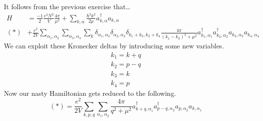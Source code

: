 \documentclass{article}
\begin{document}
It follows from the previous exercise that\dots
\begin{align}
    H&=\frac{-1}{2}\frac{e^2 N^2}{V}\frac{4\pi}{\mu^2} +
    \sum_{k,\alpha}\frac{\hbar^2 k^2}{2\mu}a_{k,\alpha}^\dagger a_{k,\alpha} \\ (\ast) & + \frac{e^2}{2V}\sum_{\alpha_1,\alpha_2}\sum_{\alpha_3,\alpha_4}\sum_k \delta_{\alpha_1,\alpha_3}\delta_{\alpha_2,\alpha_4}\delta_{k_1+k_3,k_2+k_4}\frac{4\pi}{(k_1-k_3)^2+\mu^2}a_{k_1,\alpha_1}^\dagger a_{k_2,\alpha_2}^\dagger a_{k_3,\alpha_3}a_{k_4,\alpha_4}
\end{align}
We can exploit these Kronecker deltas by introducing some new variables.
\begin{align*}
k_1=k+q\\
k_2=p-q\\
k_3=k\\
k_4=p
\end{align*}
Now our nasty Hamiltonian gets reduced to the following.
\[(\ast) = \frac{e^2}{2V}\sum_{k,p,q}\sum_{\alpha_1,\alpha_2}\frac{4\pi}{q^2+\mu^2}a_{k+q,\alpha_1}^\dagger a_{p-q,\alpha_2}^\dagger a_{p,\alpha_2}a_{k,\alpha_1}\]
\end{document}
